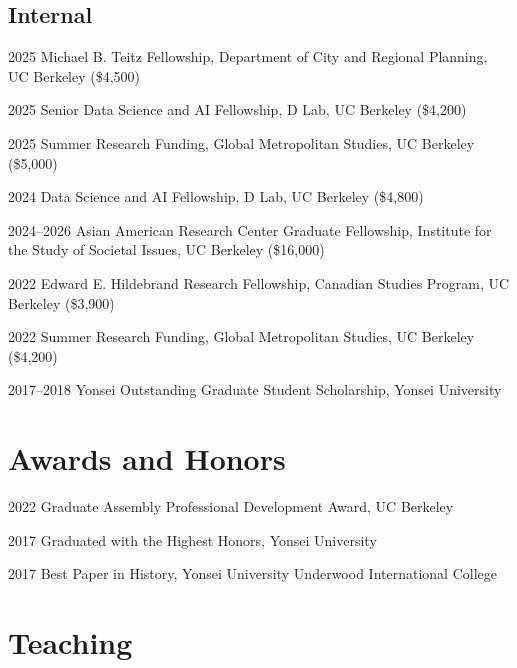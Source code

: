 \documentclass[11pt,letterpaper]{article}
\newcommand{\money}[1]{(\$#1)}
\begin{document}
\subsection{Internal}
\begin{tablist}
  \item[2025] \tab{}Michael B. Teitz Fellowship, Department of City and Regional Planning, UC Berkeley \money{4,500}
  \item[2025] \tab{}Senior Data Science and AI Fellowship, D Lab, UC Berkeley \money{4,200}
  \item[2025] \tab{}Summer Research Funding, Global Metropolitan Studies, UC Berkeley \money{5,000}
  \item[2024] \tab{}Data Science and AI Fellowship, D Lab, UC Berkeley \money{4,800}
  \item[2024–2026] \tab{}Asian American Research Center Graduate Fellowship, Institute for the Study of Societal Issues, UC Berkeley \money{16,000}
  \item[2022] \tab{}Edward E. Hildebrand Research Fellowship, Canadian Studies Program, UC Berkeley \money{3,900}
  \item[2022] \tab{}Summer Research Funding, Global Metropolitan Studies, UC Berkeley \money{4,200}
  \item[2017–2018] \tab{}Yonsei Outstanding Graduate Student Scholarship, Yonsei University
\end{tablist}

\section{Awards and Honors}
\begin{tablist}
  \item[2022] \tab{}Graduate Assembly Professional Development Award, UC Berkeley
  \item[2017] \tab{}Graduated with the Highest Honors, Yonsei University
  \item[2017] \tab{}Best Paper in History, Yonsei University Underwood International College
\end{tablist}

\section{Teaching}
\end{document}
